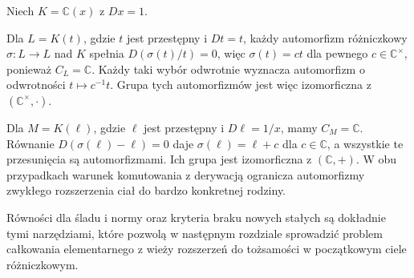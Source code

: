 \begin{przyklad}
\label{aa:prz:elementary-automorphisms}
Niech $K=\mathbb C(x)$ z $Dx=1$.

Dla $L=K(t)$, gdzie $t$ jest przestępny i $Dt=t$,
każdy automorfizm różniczkowy $\sigma:L\to L$
nad $K$ spełnia
$D(\sigma(t)/t)=0$, więc
$\sigma(t)=ct$ dla pewnego $c\in\mathbb C^\times$,
ponieważ $C_L=\mathbb C$.
Każdy taki wybór odwrotnie wyznacza automorfizm
o odwrotności $t\mapsto c^{-1}t$.
Grupa tych automorfizmów jest więc
izomorficzna z $(\mathbb C^\times,\cdot)$.

Dla $M=K(\ell)$, gdzie $\ell$ jest przestępny
i $D\ell=1/x$, mamy $C_M=\mathbb C$.
Równanie $D(\sigma(\ell)-\ell)=0$ daje
$\sigma(\ell)=\ell+c$ dla $c\in\mathbb C$,
a wszystkie te przesunięcia są automorfizmami.
Ich grupa jest izomorficzna z $(\mathbb C,+)$.
W obu przypadkach warunek komutowania z
derywacją ogranicza automorfizmy zwykłego
rozszerzenia ciał do bardzo konkretnej rodziny.
\end{przyklad}

Równości dla śladu i normy oraz kryteria
braku nowych stałych są dokładnie tymi
narzędziami, które pozwolą w następnym
rozdziale sprowadzić problem całkowania
elementarnego z wieży rozszerzeń do
tożsamości w początkowym ciele różniczkowym.
